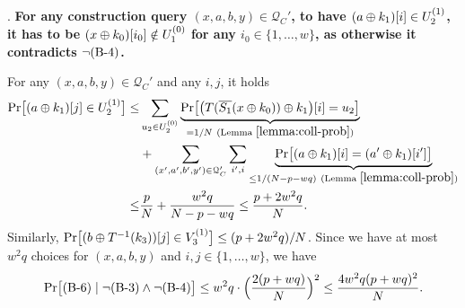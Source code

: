 %
%
%


%



\arrangespace

\noindent \textsc{\bfour}. \textbf{For any construction query $(x,a,b,y)\in\mathcal{Q}_C'$, to have $(a\oplus k_1)[i]\in U_2^{(1)}$, it has to be $(x\oplus k_0)[i_0]\notin U_1^{(0)}$ for any $i_0\in\{1,\ldots,w\}$, as otherwise it contradicts $\neg\text{(B-4)}$.}


For any $(x,a,b,y)\in\mathcal{Q}_C'$ and any $i,j$, it holds
%
\begin{align}
{\Pr}\big[(a\oplus k_1)[j]\in U_2^{(1)}\big] \leq  &  \sum_{u_2\in U_2^{(0)}}  \underbrace{{\Pr}\big[\big(T(\overline{S_1}(x\oplus k_0))\oplus k_1\big)[i]=u_2\big]}_{=1/N\ (\text{Lemma }\ref{lemma:coll-prob})}       \notag        \\
& +
\sum_{(x',a',b',y')\in\mathcal{Q}_C'}\sum_{i',i} \underbrace{{\Pr}\big[(a\oplus k_1)[i]=(a'\oplus k_1)[i']\big]}_{\leq1/(N-p-wq)\ (\text{Lemma }\ref{lemma:coll-prob})}         \notag      \\
\leq  &  \frac{p}{N}+\frac{w^2q}{N-p-wq} \leq \frac{p+2w^2q}{N}.
\notag
\end{align}
Similarly, ${\Pr}\big[(b\oplus T^{-1}(k_3))[j]\in V_3^{(1)}\big]\leq(p+2w^2q)/N$. Since we have at most $w^2q$ choices for $(x,a,b,y)$ and $i, j \in\{1, \ldots, w\}$, we have
%
$$
{\Pr}\big[\text{(B-6)}\mid\neg\text{(B-3)}\wedge\neg\text{(B-4)}\big] \leq
w^2q\cdot\Big(\frac{2(p+wq)}{N}\Big)^2\leq \frac{4w^2q(p+wq)^2}{N}.
$$


